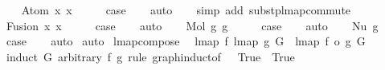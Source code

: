\begin{isabellebody}
\ \ \isamarkupfalse%
\ {\isacharparenleft}{\kern0pt}Atom\ x{}\ x{}{\isacharparenright}{\kern0pt}\isanewline
\ \ \isamarkupfalse%
\ \isamarkupfalse%
\ {\isacharquery}{\kern0pt}case\isanewline
\ \ \isamarkupfalse%
\ auto\isanewline
\ \ \isamarkupfalse%
\ {\isacharparenleft}{\kern0pt}simp\ add{\isacharcolon}{\kern0pt}\ subst{\isacharunderscore}{\kern0pt}p{\isacharunderscore}{\kern0pt}lmap{\isacharunderscore}{\kern0pt}commute{\isacharparenright}{\kern0pt}\isanewline
{}\isamarkupfalse%
\isanewline
\ \ \isamarkupfalse%
\ {\isacharparenleft}{\kern0pt}Fusion\ x{}\ x{}{\isacharparenright}{\kern0pt}\isanewline
\ \ \isamarkupfalse%
\ \isamarkupfalse%
\ {\isacharquery}{\kern0pt}case\isanewline
\ \ \isamarkupfalse%
\ auto\isanewline
{}\isamarkupfalse%
\isanewline
\ \ \isamarkupfalse%
\ {\isacharparenleft}{\kern0pt}Mol\ g{}{}\ g{}{}{\isacharparenright}{\kern0pt}\isanewline
\ \ \isamarkupfalse%
\ \isamarkupfalse%
\ {\isacharquery}{\kern0pt}case\isanewline
\ \ \isamarkupfalse%
\ auto\isanewline
{}\isamarkupfalse%
\isanewline
\ \ \isamarkupfalse%
\ {\isacharparenleft}{\kern0pt}Nu\ g{}{\isacharparenright}{\kern0pt}\isanewline
\ \ \isamarkupfalse%
\ \isamarkupfalse%
\ {\isacharquery}{\kern0pt}case\isanewline
\ \ \isamarkupfalse%
\ auto\isanewline
{}\isamarkupfalse%
\ auto%
\endisatagproof
{\isafoldproof}%
%
\isadelimproof
\isanewline
%
\endisadelimproof
\isanewline
\isanewline
{}\isamarkupfalse%
\ lmap{\isacharunderscore}{\kern0pt}compose{\isacharcolon}{\kern0pt}\isanewline
\ \ {\isachardoublequoteopen}lmap\ f\ {\isacharparenleft}{\kern0pt}lmap\ g\ G{\isacharparenright}{\kern0pt}\ {\isacharequal}{\kern0pt}\ lmap\ {\isacharparenleft}{\kern0pt}f\ o\ g{\isacharparenright}{\kern0pt}\ G{\isachardoublequoteclose}\isanewline
%
\isadelimproof
%
\endisadelimproof
%
\isatagproof
{}\isamarkupfalse%
\ {\isacharparenleft}{\kern0pt}induct\ G\ arbitrary{\isacharcolon}{\kern0pt}\ f\ g\ rule{\isacharcolon}{\kern0pt}\ graph{\isachardot}{\kern0pt}induct{\isacharbrackleft}{\kern0pt}of\ {\isacharunderscore}{\kern0pt}\ {\isachardoublequoteopen}{\isacharpercent}{\kern0pt}{\isacharunderscore}{\kern0pt}{\isachardot}{\kern0pt}\ True{\isachardoublequoteclose}\ {\isachardoublequoteopen}{\isacharpercent}{\kern0pt}{\isacharunderscore}{\kern0pt}{\isachardot}{\kern0pt}\ True{\isachardoublequoteclose}{\isacharbrackright}{\kern0pt}{\isacharparenright}{\kern0pt}\isanewline

\end{isabellebody}
